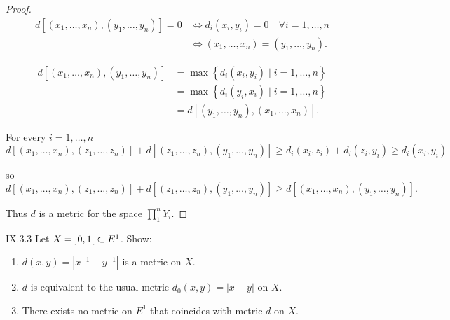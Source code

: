 \begin{proof}
	\begingroup
	\allowdisplaybreaks%
	\begin{align*}
		d[(x_{1}, \ldots, x_{n}), (y_{1}, \ldots, y_{n})] = 0 & \iff d_{i}(x_{i}, y_{i}) = 0 \quad \forall i = 1, \ldots, n \\
		                                                      & \iff (x_{1}, \ldots, x_{n}) = (y_{1}, \ldots, y_{n}).
	\end{align*}
	\endgroup

	\begingroup
	\allowdisplaybreaks%
	\begin{align*}
		d[(x_{1}, \ldots, x_{n}), (y_{1}, \ldots, y_{n})] & = \max\left\{ d_{i}(x_{i}, y_{i}) \mid i = 1, \ldots, n \right\} \\
		                                                  & = \max\left\{ d_{i}(y_{i}, x_{i}) \mid i = 1, \ldots, n \right\} \\
		                                                  & = d[(y_{1}, \ldots, y_{n}), (x_{1}, \ldots, x_{n})].
	\end{align*}
	\endgroup

	For every \( i = 1, \ldots, n \)
	\[
		d[(x_{1}, \ldots, x_{n}), (z_{1}, \ldots, z_{n})] + d[(z_{1}, \ldots, z_{n}), (y_{1}, \ldots, y_{n})] \ge d_{i}(x_{i}, z_{i}) + d_{i}(z_{i}, y_{i}) \ge d_{i}(x_{i}, y_{i})
	\]

	so
	\[
		d[(x_{1}, \ldots, x_{n}), (z_{1}, \ldots, z_{n})] + d[(z_{1}, \ldots, z_{n}), (y_{1}, \ldots, y_{n})] \ge d[(x_{1}, \ldots, x_{n}), (y_{1}, \ldots, y_{n})].
	\]

	Thus \( d \) is a metric for the space \( \prod^{n}_{1} Y_{i} \).
\end{proof}

\begin{problem}{IX.3.3}
Let \( X = \left\rbrack{0, 1}\right\lbrack \subset E^{1} \). Show:
\begin{enumerate}[label={(\alph*)}]
	\item \( d(x, y) = \left\vert x^{-1} - y^{-1} \right\vert \) is a metric on \( X \).
	\item \( d \) is equivalent to the usual metric \( d_{0}(x, y) = \left\vert x - y \right\vert \) on \( X \).
	\item There exists no metric on \( E^{1} \) that coincides with metric \( d \) on \( X \).
\end{enumerate}
\end{problem}


